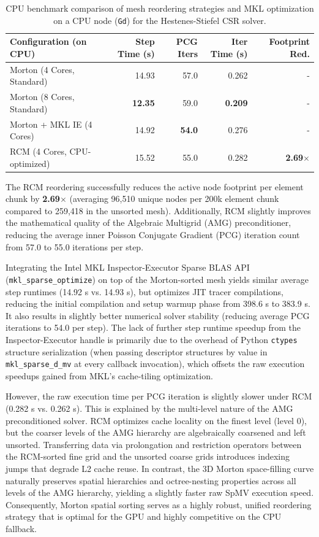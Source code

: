 \documentclass[11pt,a4paper]{article}
\begin{document}
\begin{table}[h]
    \centering
    \small
    \begin{tabular}{lrrrr}
        \toprule
        \textbf{Configuration (on CPU)} & \textbf{Step Time (s)} & \textbf{PCG Iters} & \textbf{Iter Time (s)} & \textbf{Footprint Red.} \\
        \midrule
        Morton (4 Cores, Standard) & 14.93 & 57.0 & 0.262 & - \\
        Morton (8 Cores, Standard) & \textbf{12.35} & 59.0 & \textbf{0.209} & - \\
        Morton + MKL IE (4 Cores) & 14.92 & \textbf{54.0} & 0.276 & - \\
        RCM (4 Cores, CPU-optimized) & 15.52 & 55.0 & 0.282 & \textbf{2.69$\times$} \\
        \bottomrule
    \end{tabular}
    \caption{CPU benchmark comparison of mesh reordering strategies and MKL optimization on a CPU node (\texttt{Gd}) for the Hestenes-Stiefel CSR solver.}
    \label{tab:cpu_results}
\end{table}

The RCM reordering successfully reduces the active node footprint per element chunk by \textbf{2.69$\times$} (averaging 96,510 unique nodes per 200k element chunk compared to 259,418 in the unsorted mesh). Additionally, RCM slightly improves the mathematical quality of the Algebraic Multigrid (AMG) preconditioner, reducing the average inner Poisson Conjugate Gradient (PCG) iteration count from 57.0 to 55.0 iterations per step.

Integrating the Intel MKL Inspector-Executor Sparse BLAS API (\texttt{mkl\_sparse\_optimize}) on top of the Morton-sorted mesh yields similar average step runtimes (14.92 s vs. 14.93 s), but optimizes JIT tracer compilations, reducing the initial compilation and setup warmup phase from 398.6 s to 383.9 s. It also results in slightly better numerical solver stability (reducing average PCG iterations to 54.0 per step). The lack of further step runtime speedup from the Inspector-Executor handle is primarily due to the overhead of Python \texttt{ctypes} structure serialization (when passing descriptor structures by value in \texttt{mkl\_sparse\_d\_mv} at every callback invocation), which offsets the raw execution speedups gained from MKL's cache-tiling optimization.

However, the raw execution time per PCG iteration is slightly slower under RCM (0.282 s vs. 0.262 s). This is explained by the multi-level nature of the AMG preconditioned solver. RCM optimizes cache locality on the finest level (level 0), but the coarser levels of the AMG hierarchy are algebraically coarsened and left unsorted. Transferring data via prolongation and restriction operators between the RCM-sorted fine grid and the unsorted coarse grids introduces indexing jumps that degrade L2 cache reuse. In contrast, the 3D Morton space-filling curve naturally preserves spatial hierarchies and octree-nesting properties across all levels of the AMG hierarchy, yielding a slightly faster raw SpMV execution speed. Consequently, Morton spatial sorting serves as a highly robust, unified reordering strategy that is optimal for the GPU and highly competitive on the CPU fallback.
\end{document}

